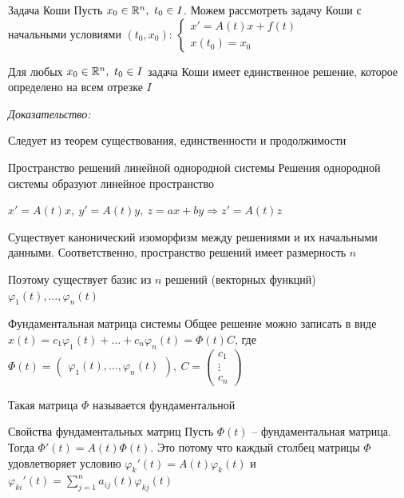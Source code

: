 \documentclass[12pt]{article}
\begin{document}
\begin{defin}{Задача Коши}
    Пусть $x_0 \in \mathbb R^n,\ t_0 \in I$. Можем рассмотреть задачу Коши с начальными условиями $(t_0, x_0)$: $\begin{cases}
        x' = A(t)x + f(t) \\
        x(t_0) = x_0
    \end{cases}$
\end{defin}

\begin{theo}{}
    Для любых $x_0 \in \mathbb R^n,\ t_0 \in I$ задача Коши имеет единственное решение, которое определено на всем отрезке $I$
\end{theo}

\textit{Доказательство:}

Следует из теорем существования, единственности и продолжимости

\begin{defin}{Пространство решений линейной однородной системы}
    Решения однородной системы образуют линейное пространство 

    $x' = A(t)x,\ y' = A(t)y,\ z = ax + by \Rightarrow z' = A(t)z$
\end{defin}

\begin{Remark}{}
    Существует канонический изоморфизм между решениями и их начальными данными. Соответственно, пространство решений имеет размерность $n$

    Поэтому существует базис из $n$ решений (векторных функций) $\varphi_1(t), \ldots, \varphi_n(t)$
\end{Remark}

\begin{defin}{Фундаментальная матрица системы}
    Общее решение можно записать в виде $x(t) = c_1\varphi_1(t) + \ldots + c_n\varphi_n(t) = \Phi(t)C$, где $\Phi(t) = \begin{pmatrix}
        \varphi_1(t), \ldots, \varphi_n(t)
    \end{pmatrix},\ C = \begin{pmatrix}
        c_1 \\
        \vdots \\
        c_n
    \end{pmatrix}$

    Такая матрица $\Phi$ называется фундаментальной
\end{defin}

\begin{theo}{Свойства фундаментальных матриц}
    Пусть $\Phi(t)$ -- фундаментальная матрица. Тогда $\Phi'(t) = A(t)\Phi(t)$. Это потому что каждый столбец матрицы $\Phi$ удовлетворяет условию $\varphi_k'(t) = A(t)\varphi_k(t)$ и $\varphi_{ki}'(t) = \sum\limits_{j = 1}^n a_{ij}(t)\varphi_{kj}(t)$ 
\end{theo}
\end{document}
